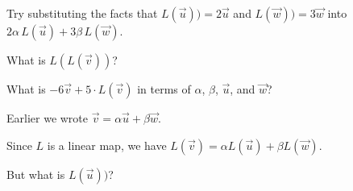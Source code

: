 \documentclass{ximera}
\begin{document}
\begin{question}
\begin{solution}
    \begin{hint}
      Try substituting the facts that $L(\vec{u})) = 2 \vec{u}$ and $L(\vec{w})) = 3 \vec{w}$ into $2\alpha\,L(\vec{u}) + 3\beta\,L(\vec{w})$.
    \end{hint}

    What is $L(L(\vec{v}))$?
    \begin{multiple-choice}
    \end{multiple-choice} 
  \end{solution}

  What is $-6 \vec{v} + 5 \cdot L(\vec{v})$ in terms of $\alpha$, $\beta$, $\vec{u}$, and $\vec{w}$?
  \begin{solution}
    \begin{hint}
      Earlier we wrote $\vec{v} = \alpha \vec{u} + \beta \vec{w}$.
    \end{hint}

    \begin{hint}
      Since $L$ is a linear map, we have $L(\vec{v}) = \alpha L(\vec{u}) + \beta L(\vec{w})$.
    \end{hint}

    \begin{multiple-choice}
    \end{multiple-choice} 
  \end{solution}

  \begin{question}
    \begin{hint}
      \begin{question}
        \begin{solution}
          But what is $L(\vec{u}))$?

          \begin{multiple-choice}
          \end{multiple-choice} 
        \end{solution}
      \end{question}
    \end{hint}


\end{question}
\end{question}
\end{document}
